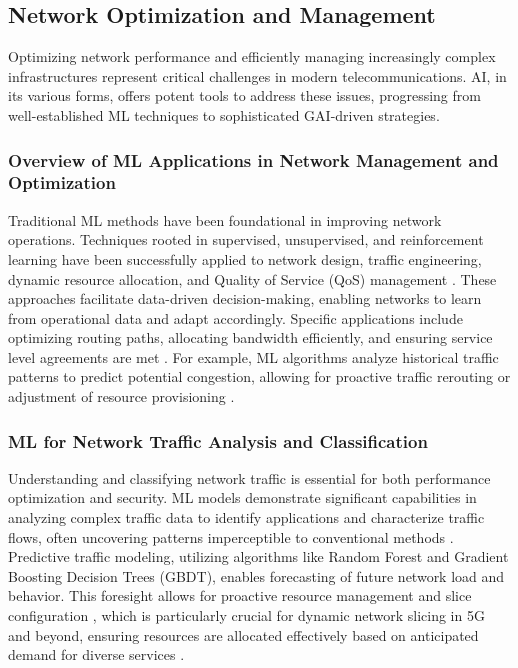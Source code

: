 \documentclass[sigconf]{acmart}
\begin{document}
\subsection{Network Optimization and Management} \label{subsec:optimization}

Optimizing network performance and efficiently managing increasingly complex infrastructures represent critical challenges in modern telecommunications. AI, in its various forms, offers potent tools to address these issues, progressing from well-established ML techniques to sophisticated GAI-driven strategies.

\subsubsection{Overview of ML Applications in Network Management and Optimization} \label{subsubsec:ml_overview}
Traditional ML methods have been foundational in improving network operations. Techniques rooted in supervised, unsupervised, and reinforcement learning have been successfully applied to network design, traffic engineering, dynamic resource allocation, and Quality of Service (QoS) management \cite{ref1,ref12,ref34}. These approaches facilitate data-driven decision-making, enabling networks to learn from operational data and adapt accordingly. Specific applications include optimizing routing paths, allocating bandwidth efficiently, and ensuring service level agreements are met \cite{ref12}. For example, ML algorithms analyze historical traffic patterns to predict potential congestion, allowing for proactive traffic rerouting or adjustment of resource provisioning \cite{ref12,ref34}.

\subsubsection{ML for Network Traffic Analysis and Classification} \label{subsubsec:ml_traffic}
Understanding and classifying network traffic is essential for both performance optimization and security. ML models demonstrate significant capabilities in analyzing complex traffic data to identify applications and characterize traffic flows, often uncovering patterns imperceptible to conventional methods \cite{ref11}. Predictive traffic modeling, utilizing algorithms like Random Forest and Gradient Boosting Decision Trees (GBDT), enables forecasting of future network load and behavior. This foresight allows for proactive resource management and slice configuration \cite{ref11}, which is particularly crucial for dynamic network slicing in 5G and beyond, ensuring resources are allocated effectively based on anticipated demand for diverse services \cite{ref11}.
\end{document}
